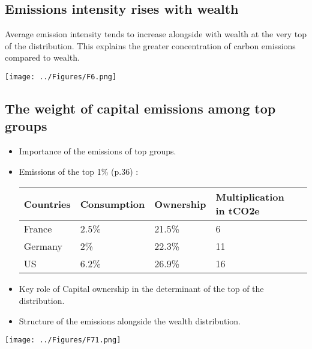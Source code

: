 \documentclass{beamer}
\begin{document}
\subsection{Emissions intensity rises with wealth}
\begin{frame}{\subsecname}
    Average emission intensity tends to increase alongside with wealth at the very top of the distribution.
    This explains the greater concentration of carbon emissions compared to wealth.
    \begin{center}
        \texttt{[image: ../Figures/F6.png]}
    \end{center}
\end{frame}

\subsection{The weight of capital emissions among top groups}

\begin{frame}{\subsecname}
    \begin{itemize}
        \item Importance of the emissions of top groups.
        \item Emissions of the top 1\% (p.36) :
        \begin{table}[!ht]
            \centering
            \begin{tabular}{|l|l|l|l|l|}
            \hline
                Countries & Consumption & Ownership & Multiplication in tCO2e \\ \hline
                France & 2.5\% & 21.5\% & 6 \\ \hline
                Germany & 2\% & 22.3\% & 11 \\ \hline
                US & 6.2\% & 26.9\% & 16 \\ \hline
            \end{tabular}
        \end{table}
        \item Key role of Capital ownership in the determinant of the top of the distribution.
        \item Structure of the emissions alongside the wealth distribution.
    \end{itemize}
\end{frame}

\begin{frame}{\subsecname}
    \begin{center}
        \texttt{[image: ../Figures/F71.png]}
    \end{center}
\end{frame}
\end{document}
